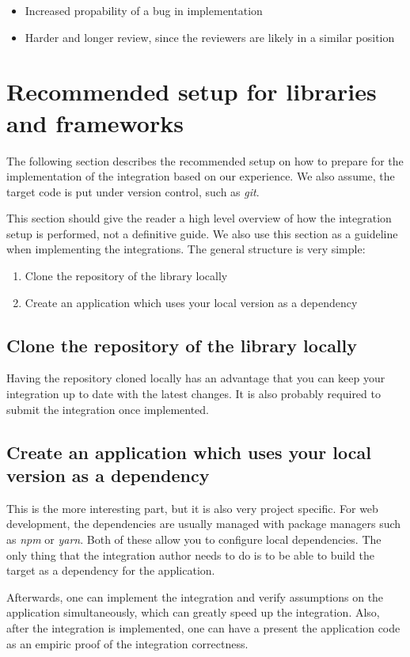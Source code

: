 \begin{itemize}
  \item Increased propability of a bug in implementation
  \item Harder and longer review, since the reviewers are likely in a similar position
\end{itemize}

\section{Recommended setup for libraries and frameworks}
\label{recommended_setup_for_libraries}

The following section describes the recommended setup on how to prepare for the implementation of
the integration based on our experience. We also assume, the target code is put under version
control, such as \textit{git}.

This section should give the reader a high level overview of how the integration setup is performed,
not a definitive guide. We also use this section as a guideline when implementing the integrations.
The general structure is very simple:

\begin{enumerate}
  \item Clone the repository of the library locally
  \item Create an application which uses your local version as a dependency
\end{enumerate}

\subsection{Clone the repository of the library locally}

Having the repository cloned locally has an advantage that you can keep your integration up to date
with the latest changes. It is also probably required to submit the integration once implemented.

\subsection{Create an application which uses your local version as a dependency}

This is the more interesting part, but it is also very project specific. For web development, the
dependencies are usually managed with package managers such as \textit{npm} or \textit{yarn}. Both
of these allow you to configure local dependencies. The only thing that the integration author needs
to do is to be able to build the target as a dependency for the application.

Afterwards, one can implement the integration and verify assumptions on the application
simultaneously, which can greatly speed up the integration. Also, after the integration is
implemented, one can have a present the application code as an empiric proof of the integration
correctness.
